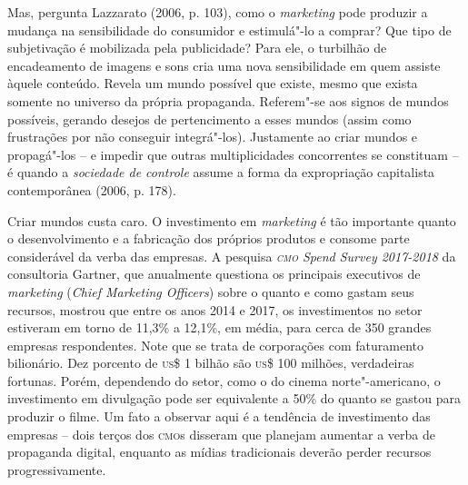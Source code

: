 Mas, pergunta Lazzarato (2006, p. 103), como o \emph{marketing} pode
produzir a mudança na sensibilidade do consumidor e estimulá"-lo a
comprar? Que tipo de subjetivação é mobilizada pela publicidade? Para
ele, o turbilhão de encadeamento de imagens e sons cria uma nova
sensibilidade em quem assiste àquele conteúdo. Revela um mundo possível
que existe, mesmo que exista somente no universo da própria propaganda.
Referem"-se aos signos de mundos possíveis, gerando desejos de
pertencimento a esses mundos (assim como frustrações por não conseguir
integrá"-los). Justamente ao criar mundos e propagá"-los -- e impedir que
outras multiplicidades concorrentes se constituam -- é quando a
\emph{sociedade de controle} assume a forma da expropriação capitalista
contemporânea (2006, p. 178).

Criar mundos custa caro. O investimento em \emph{marketing} é tão
importante quanto o desenvolvimento e a fabricação dos próprios produtos
e consome parte considerável da verba das empresas. A pesquisa \emph{\textsc{cmo}
Spend Survey 2017-2018} da consultoria Gartner, que anualmente questiona
os principais executivos de \emph{marketing} (\emph{Chief Marketing
Officers}) sobre o quanto e como gastam seus recursos, mostrou que entre
os anos 2014 e 2017, os investimentos no setor estiveram em torno de
11,3\% a 12,1\%, em média, para cerca de 350 grandes empresas
respondentes. Note que se trata de corporações com faturamento
bilionário. Dez porcento de \textsc{us}\$ 1 bilhão são \textsc{us}\$ 100 milhões,
verdadeiras fortunas. Porém, dependendo do setor, como o do cinema
norte"-americano, o investimento em divulgação pode ser equivalente a
50\% do quanto se gastou para produzir o filme. Um fato a observar aqui
é a tendência de investimento das empresas -- dois terços dos \textsc{cmo}s
disseram que planejam aumentar a verba de propaganda digital, enquanto
as mídias tradicionais deverão perder recursos progressivamente.

